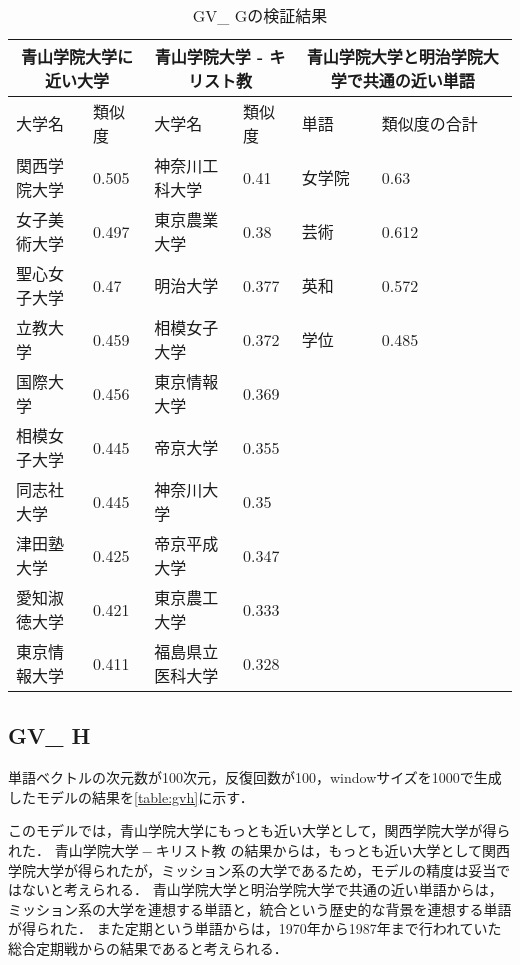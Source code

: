 \begin{table}[H]
\caption{GV\_ Gの検証結果}
\centering
\footnotesize
\begin{tabular}{ll|ll|ll}
\hline
\multicolumn{2}{c}{青山学院大学に近い大学} & \multicolumn{2}{c}{青山学院大学 - キリスト教} & \multicolumn{2}{c}{青山学院大学と明治学院大学で共通の近い単語}
\\ \hline
大学名 & 類似度 & 大学名 & 類似度 & 単語 & 類似度の合計
\\ \hline \hline
関西学院大学 & 0.505 & 神奈川工科大学 & 0.41 & 女学院 & 0.63\\
女子美術大学 & 0.497 & 東京農業大学 & 0.38 & 芸術 & 0.612\\
聖心女子大学 & 0.47 & 明治大学 & 0.377 & 英和 & 0.572\\
立教大学 & 0.459 & 相模女子大学 & 0.372 & 学位 & 0.485\\
国際大学 & 0.456 & 東京情報大学 & 0.369 & & \\
相模女子大学 & 0.445 & 帝京大学 & 0.355 & & \\
同志社大学 & 0.445 & 神奈川大学 & 0.35 & & \\
津田塾大学 & 0.425 & 帝京平成大学 & 0.347 & & \\
愛知淑徳大学 & 0.421 & 東京農工大学 & 0.333 & & \\
東京情報大学 & 0.411 & 福島県立医科大学 & 0.328 & & \\ \hline
\end{tabular}
\label{table:gvg}
\end{table}

\subsection{GV\_ H}
単語ベクトルの次元数が100次元，反復回数が100，windowサイズを1000で生成したモデルの結果を\ref{table:gvh}に示す．

このモデルでは，青山学院大学にもっとも近い大学として，関西学院大学が得られた．
$ 青山学院大学 - キリスト教 $ の結果からは，もっとも近い大学として関西学院大学が得られたが，ミッション系の大学であるため，モデルの精度は妥当ではないと考えられる．
青山学院大学と明治学院大学で共通の近い単語からは，ミッション系の大学を連想する単語と，統合という歴史的な背景を連想する単語が得られた．
また定期という単語からは，1970年から1987年まで行われていた総合定期戦からの結果であると考えられる．

